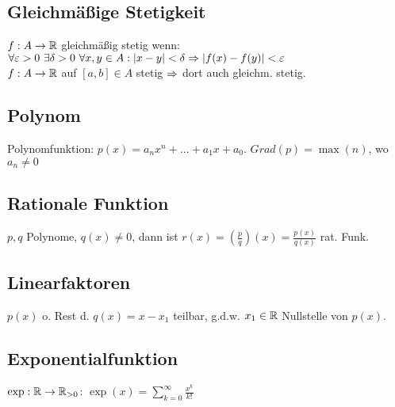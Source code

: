 \subsection*{Gleichmäßige Stetigkeit}
$f: A \rightarrow \mathbb R$ gleichmäßig stetig wenn: $\forall \varepsilon > 0 \ \exists \delta > 0 \ \forall x, y \in A: |x - y| < \delta \Rightarrow |f(x) - f(y)| < \varepsilon$\\
$f: A \rightarrow \mathbb R$ auf $[a, b] \in A$ stetig $\Rightarrow$ dort auch gleichm. stetig.
\subsection*{Polynom}
Polynomfunktion: $p(x) = a_n x^n + ... + a_1 x + a_0$. $Grad(p) = \max(n)$, wo $a_n \neq 0$
\subsection*{Rationale Funktion}
$p, q$ Polynome, $q(x) \neq 0$, dann ist $r(x) = \left(\frac{p}{q}\right)(x) = \frac{p(x)}{q(x)}$ rat. Funk.
\subsection*{Linearfaktoren}
$p(x)$ o. Rest d. $q(x) = x - x_1$ teilbar, g.d.w. $x_1 \in \mathbb R$ Nullstelle von $p(x)$.
\subsection*{Exponentialfunktion}
$\exp: \mathbb R \rightarrow \mathbb R_{> 0}$: $\exp(x) = \sum_{k = 0}^{\infty} \frac{x^k}{k!}$
